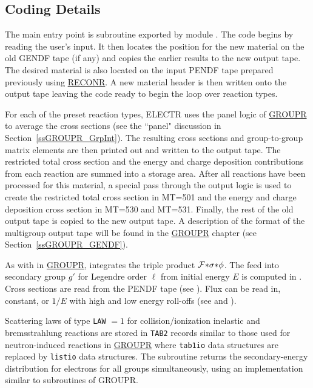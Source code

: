 \subsection{Coding Details}
\label{ssELECTR_details}

The main entry point is subroutine  exported by
module .
The code begins by reading the user's input. It then locates the
position for the new material on the old GENDF
tape (if any) and copies the earlier results to the new output
tape. The desired material is also located on the input
PENDF tape prepared previously using
\hyperlink{sRECONRhy}{RECONR}.
A new material header is then written onto the output tape leaving
the code ready to begin the loop over reaction types.

For each of the preset reaction types, ELECTR uses the panel logic
of \hyperlink{sGROUPRhy}{GROUPR} to average the cross
sections (see the ``panel" discussion in Section~\ref{ssGROUPR_GrpInt}).
The resulting cross sections and group-to-group matrix elements are
then printed out and written to the output tape. The restricted total
cross section and the energy and charge deposition contributions from
each reaction are summed into a storage area. After all reactions have
been processed for this material, a special pass through the output
logic is used to create the restricted total cross section in MT=501
and the energy and charge deposition cross section in MT=530 and MT=531.
Finally, the rest of the old output tape is copied to the new output
tape. A description of the format of the multigroup output tape will
be found in the \hyperlink{sGROUPRhy}{GROUPR} chapter (see
Section~\ref{ssGROUPR_GENDF}).

As with  in \hyperlink{sGROUPRhy}{GROUPR},
 integrates the triple product
${\cal F}{*}\sigma{*}\phi$.  The feed into secondary group $g'$ for
Legendre order $\ell$ from initial energy $E$ is computed in
. Cross sections are read from
the PENDF tape (see ). Flux can
be read in, constant, or $1/E$ with high and low energy roll-offs (see
 and
).

Scattering laws of type {\tt LAW} $=1$ for collision/ionization inelastic
and bremss\-trahlung reactions are stored in {\tt TAB2} records similar to
those used for neutron-induced reactions in \hyperlink{sGROUPRhy}{GROUPR}
 where {\tt tab1io} data structures are replaced by {\tt listio}
data structures. The subroutine 
returns the secondary-energy distribution for electrons for all groups
simultaneously, using an implementation similar to subroutines 
of  GROUPR.

